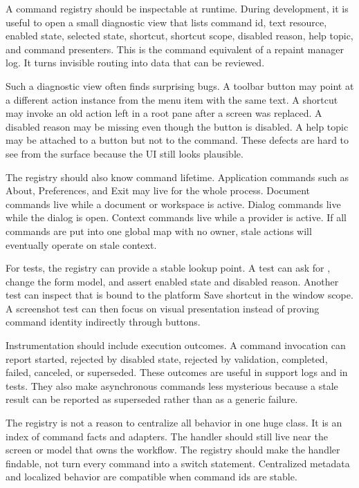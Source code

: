 A command registry should be inspectable at runtime. During development, it is useful to open a small diagnostic view that lists command id, text resource, enabled state, selected state, shortcut, shortcut scope, disabled reason, help topic, and command presenters. This is the command equivalent of a repaint manager log. It turns invisible routing into data that can be reviewed.

Such a diagnostic view often finds surprising bugs. A toolbar button may point at a different action instance from the menu item with the same text. A shortcut may invoke an old action left in a root pane after a screen was replaced. A disabled reason may be missing even though the button is disabled. A help topic may be attached to a button but not to the command. These defects are hard to see from the surface because the UI still looks plausible.

The registry should also know command lifetime. Application commands such as About, Preferences, and Exit may live for the whole process. Document commands live while a document or workspace is active. Dialog commands live while the dialog is open. Context commands live while a provider is active. If all commands are put into one global map with no owner, stale actions will eventually operate on stale context.

For tests, the registry can provide a stable lookup point. A test can ask for , change the form model, and assert enabled state and disabled reason. Another test can inspect that  is bound to the platform Save shortcut in the window scope. A screenshot test can then focus on visual presentation instead of proving command identity indirectly through buttons.

Instrumentation should include execution outcomes. A command invocation can report started, rejected by disabled state, rejected by validation, completed, failed, canceled, or superseded. These outcomes are useful in support logs and in tests. They also make asynchronous commands less mysterious because a stale result can be reported as superseded rather than as a generic failure.

The registry is not a reason to centralize all behavior in one huge class. It is an index of command facts and adapters. The handler should still live near the screen or model that owns the workflow. The registry should make the handler findable, not turn every command into a switch statement. Centralized metadata and localized behavior are compatible when command ids are stable.

